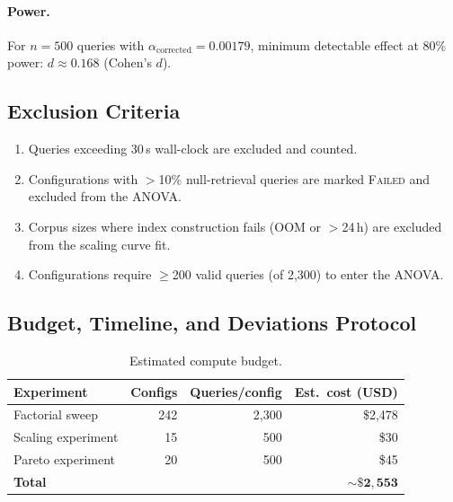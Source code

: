 \paragraph{Power.}
For $n = 500$ queries with $\alpha_\text{corrected} = 0.00179$,
minimum detectable effect at 80\% power:
$d \approx 0.168$ (Cohen's $d$).

\subsection{Exclusion Criteria}
\label{prereg:sec:exclusion}

\begin{enumerate}[nosep,leftmargin=1.5em]
  \item Queries exceeding 30\,s wall-clock are excluded and counted.
  \item Configurations with $>$10\% null-retrieval queries are marked
    \textsc{Failed} and excluded from the ANOVA.
  \item Corpus sizes where index construction fails (OOM or $>$24\,h)
    are excluded from the scaling curve fit.
  \item Configurations require $\geq$200 valid queries (of 2{,}300)
    to enter the ANOVA.
\end{enumerate}

\subsection{Budget, Timeline, and Deviations Protocol}
\label{prereg:sec:budget}

\begin{table}[h]
\centering
\footnotesize
\caption{Estimated compute budget.}
\label{prereg:tab:budget}
\begin{tabular}{@{}lrrr@{}}
\toprule
Experiment & Configs & Queries/config & Est.\ cost (USD) \\
\midrule
Factorial sweep     & 242 & 2{,}300 & \$2{,}478 \\
Scaling experiment  & 15  & 500     & \$30 \\
Pareto experiment   & 20  & 500     & \$45 \\
\midrule
\textbf{Total}      &     &         & $\mathbf{\sim\$2{,}553}$ \\
\bottomrule
\end{tabular}
\end{table}

